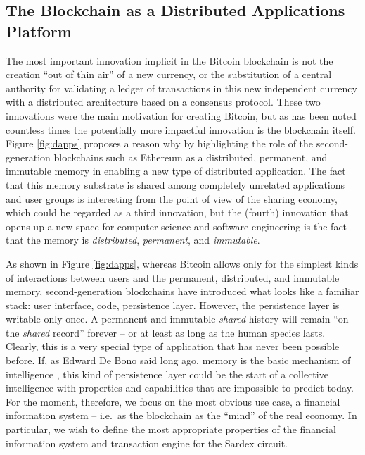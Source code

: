 \subsection{The Blockchain as a Distributed Applications Platform}
The most important innovation implicit in the Bitcoin blockchain is not the creation ``out of thin air'' of a new currency, or the substitution of a central authority for validating a ledger of transactions in this new independent currency with a distributed architecture based on a consensus protocol. These two innovations were the main motivation for creating Bitcoin, but as has been noted countless times the potentially more impactful innovation is the blockchain itself. Figure \ref{fig:dapps} proposes a reason why by highlighting the role of the second-generation blockchains such as Ethereum as a distributed, permanent, and immutable memory in enabling a new type of distributed application. The fact that this memory substrate is shared among completely unrelated applications and user groups is interesting from the point of view of the sharing economy, which could be regarded as a third innovation, but the (fourth) innovation that opens up a new space for computer science and software engineering is the fact that the memory is \emph{distributed}, \emph{permanent}, and \emph{immutable}.

As shown in Figure \ref{fig:dapps}, whereas Bitcoin allows only for the simplest kinds of interactions between users and the permanent, distributed, and immutable memory, second-generation blockchains have introduced what looks like a familiar stack: user interface, code, persistence layer. However, the persistence layer is writable only once. A permanent and immutable \emph{shared} history will remain ``on the \emph{shared} record'' forever -- or at least as long as the human species lasts. Clearly, this is a very special type of application that has never been possible before. If, as Edward De Bono said long ago, memory is the basic mechanism of intelligence \cite{DeBono1969}, this kind of persistence layer could be the start of a collective intelligence with properties and capabilities that are impossible to predict today. For the moment, therefore, we focus on the most obvious use case, a financial information system -- i.e.\ as the blockchain as the ``mind'' of the real economy. In particular, we wish to define the most appropriate properties of the financial information system and transaction engine for the Sardex circuit.


